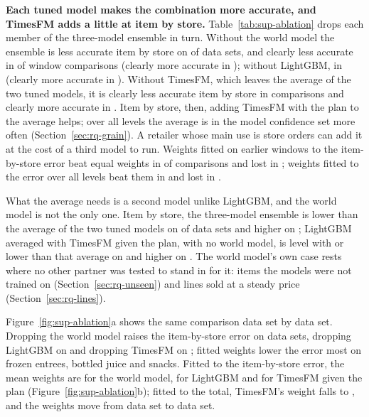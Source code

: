 \textbf{Each tuned model makes the combination more accurate, and TimesFM adds a
little at item by store.} Table~\ref{tab:sup-ablation} drops each member of the
three-model ensemble in turn. Without the world model the ensemble is less
accurate item by store on \supNoWmWorse{} of \supAblationSets{} data sets, and
clearly less accurate in \supPNoWmWorse{} of \supPNoWmN{} window comparisons
(clearly more accurate in \supPNoWmBetter{}); without LightGBM, in
\supPNoLgbWorse{} (clearly more accurate in \supPNoLgbBetter{}). Without TimesFM,
which leaves the average of the two tuned models, it is clearly less accurate item
by store in \supPNoTfmWorse{} comparisons and clearly more accurate in
\supPNoTfmBetter{}. Item by store, then, adding TimesFM with the plan to the
average helps; over all levels the average is in the model confidence set more
often (Section~\ref{sec:rq-grain}). A retailer whose main use is store orders can
add it at the cost of a third model to run. Weights fitted on earlier windows to
the item-by-store error beat equal weights in \supPFitBottomBetter{} of
\supPFitBottomN{} comparisons and lost in \supPFitBottomWorse{}; weights fitted to
the error over all levels beat them in \supPFitAllBetter{} and lost in
\supPFitAllWorse{}.

What the average needs is a second model unlike LightGBM, and the world model is
not the only one. Item by store, the three-model ensemble is lower than the
average of the two tuned models on \ptThreeBelowAvg{} of \ptSets{} data sets and
higher on \ptThreeAboveAvg; LightGBM averaged with TimesFM given the plan, with no
world model, is level with or lower than that average on \ptNoWmAtOrBelowAvg{} and
higher on \ptNoWmAboveAvg. The world model's own case rests where no other partner
was tested to stand in for it: items the models were not trained on
(Section~\ref{sec:rq-unseen}) and lines sold at a steady price
(Section~\ref{sec:rq-lines}).

Figure~\ref{fig:sup-ablation}a shows the same comparison data set by data set.
Dropping the world model raises the item-by-store error on \sfAblNoWmWorse{}
data sets, dropping LightGBM on \sfAblNoLgbWorse{} and dropping TimesFM on
\sfAblNoTfmWorse{}; fitted weights lower the error most on frozen entrees,
bottled juice and snacks. Fitted to the item-by-store error, the mean
weights are \sfWtWmBottomMean{} for the world model, \sfWtLgbBottomMean{} for
LightGBM and \sfWtTfmBottomMean{} for TimesFM given the plan
(Figure~\ref{fig:sup-ablation}b); fitted to the total, TimesFM's weight falls to
\sfWtTfmTotalMean{}, and the weights move from data set to data set.

